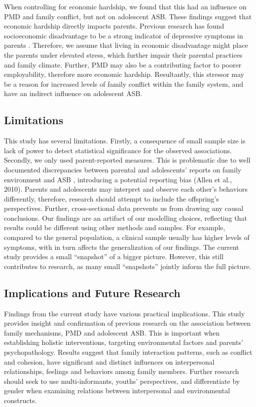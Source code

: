 When controlling for economic hardship, we found that this had an influence on PMD and family conflict, but not on adolescent ASB. These findings suggest that economic hardship directly impacts parents. Previous research has found socioeconomic disadvantage to be a strong indicator of depressive symptoms in parents \parencite{conger:2010,sturgeapple:2014,vreeland:2019}. Therefore, we assume that living in economic disadvantage might place the parents under elevated stress, which further impair their parental practices and family climate. Further, PMD may also be a contributing factor to poorer employability, therefore more economic hardship. Resultantly, this stressor may be a reason for increased levels of family conflict within the family system, and have an indirect influence on adolescent ASB.

\subsection{Limitations}

This study has several limitations. Firstly, a consequence of small sample size is lack of power to detect statistical significance for the observed associations. Secondly, we only used parent-reported measures. This is problematic due to well documented discrepancies between parental and adolescents' reports on family environment and ASB \parencite[e.g.,][]{delosreyes:2011, robinson:2019}, introducing a potential reporting bias (Allen et al., 2010). Parents and adolescents may interpret and observe each other's behaviors differently, therefore, research should attempt to include the offspring's perspectives. Further, cross-sectional data prevents us from drawing any causal conclusions. Our findings are an artifact of our modelling choices, reflecting that results could be different using other methods and samples. For example, compared to the general population, a clinical sample usually has higher levels of symptoms, with in turn affects the generalization of our findings. The current study provides a small ``snapshot'' of a bigger picture. However, this still contributes to research, as many small ``snapshots'' jointly inform the full picture.

\subsection{Implications and Future Research}

Findings from the current study have various practical implications. This study provides insight and confirmation of previous research on the association between family mechanisms, PMD and adolescent ASB. This is important when establishing holistic interventions, targeting environmental factors and parents' psychopathology. Results suggest that family interaction patterns, such as conflict and cohesion, have significant and distinct influences on interpersonal relationships, feelings and behaviors among family members. Further research should seek to use multi-informants, youths' perspectives, and differentiate by gender when examining relations between interpersonal and environmental constructs.
